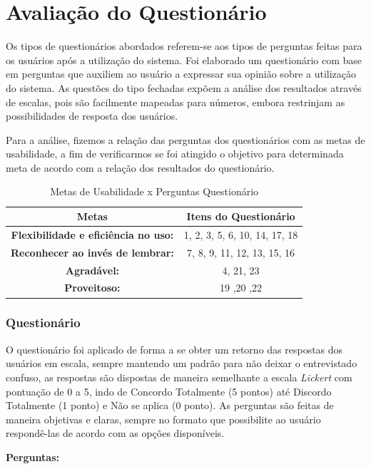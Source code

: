 \chapter[Avaliação do Questionário]{Avaliação do Questionário}

Os tipos de questionários abordados referem-se aos tipos de perguntas feitas para os usuários após a utilização do sistema.  Foi elaborado um questionário com base em perguntas que auxiliem ao usuário a expressar sua opinião sobre a utilização do sistema.
As questões do tipo fechadas expõem a análise dos resultados através de escalas, pois são facilmente mapeadas para números, embora restrinjam as possibilidades de resposta dos usuários. 

Para a análise, fizemos a relação das perguntas dos questionários com as metas de usabilidade, a fim de verificarmos se foi atingido o objetivo para determinada meta de acordo com a relação dos resultados do questionário.

\begin{table}[H]
	\centering
	\begin{tabular}{|c|c|}
		\hline 
		\textbf{Metas} & \textbf{Itens do Questionário}\tabularnewline
		\hline 
		\hline 
		\textbf{Flexibilidade e eficiência no uso:} & 1, 2, 3, 5, 6, 10, 14, 17, 18\tabularnewline
		\hline 
		\textbf{Reconhecer ao invés de lembrar:} & 7, 8, 9, 11, 12, 13, 15, 16\tabularnewline
		\hline 
		\textbf{Agradável:} & 4, 21, 23\tabularnewline
		\hline 
		\textbf{Proveitoso:} & 19 ,20 ,22\tabularnewline
		\hline 
	\end{tabular}
	\caption{Metas de Usabilidade x Perguntas Questionário}
	\label{Metas_x_Questionario}
\end{table}

\subsection{Questionário}

O questionário foi aplicado de forma a se obter um retorno das respostas dos usuários em escala, sempre mantendo um padrão para não deixar o entrevistado confuso, as respostas são dispostas de maneira semelhante a escala \textit{Lickert} com pontuação de 0 a 5, indo de Concordo Totalmente (5 pontos) até Discordo Totalmente (1 ponto) e Não se aplica (0 ponto). As perguntas são feitas de maneira objetivas e claras, sempre no formato que possibilite ao usuário respondê-las de acordo com as opções disponíveis.

\hspace{1.3cm}
\textbf{Perguntas:}

